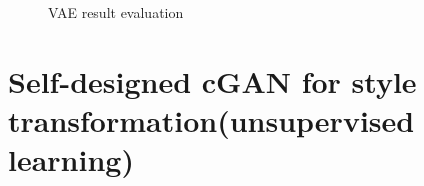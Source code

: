 \documentclass[11pt, a4paper]{article} %
\begin{document}
\begin{figure}[H]
    \hfill
    \hfill
    \caption{VAE result evaluation}
\end{figure}
\section{Self-designed cGAN for style transformation(unsupervised learning)}
\end{document}
